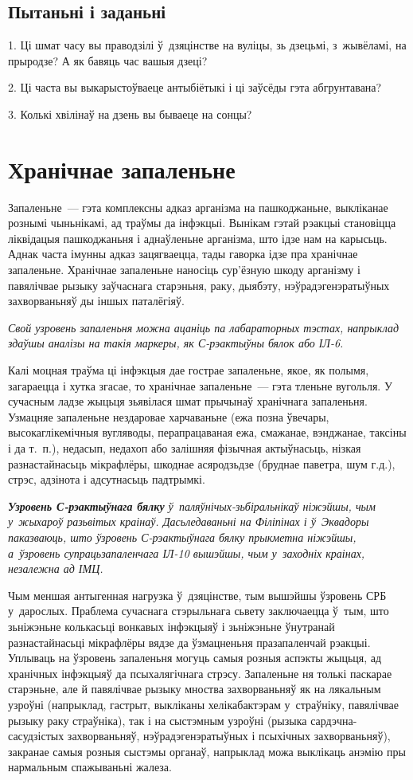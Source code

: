 \subsection*{Пытаньні і заданьні}

1. Ці шмат часу вы праводзілі ў~дзяцінстве на вуліцы, зь дзецьмі, з~жывёламі, на прыродзе? А як бавяць час вашыя дзеці?

2. Ці часта вы выкарыстоўваеце антыбіётыкі і ці заўсёды гэта абгрунтавана?

3. Колькі хвілінаў на дзень вы бываеце на сонцы?


\section{Хранічнае запаленьне}

Запаленьне~--- гэта комплексны адказ арганізма на пашкоджаньне, выкліканае рознымі чыньнікамі, ад траўмы да інфэкцыі. Вынікам гэтай рэакцыі становіцца ліквідацыя пашкоджаньня і аднаўленьне арганізма, што ідзе нам на карысьць. Аднак часта імунны адказ зацягваецца, тады гаворка ідзе пра хранічнае запаленьне. Хранічнае запаленьне наносіць сур'ёзную шкоду арганізму і павялічвае рызыку заўчаснага старэньня, раку, дыябэту, нэўрадэгенэратыўных захворваньняў ды іншых паталёгіяў.

\emph{Свой узровень запаленьня можна ацаніць па лабараторных тэстах, напрыклад здаўшы аналізы на такія маркеры, як С-рэактыўны бялок або ІЛ-6.}

Калі моцная траўма ці інфэкцыя дае гострае запаленьне, якое, як полымя, загараецца і хутка згасае, то хранічнае запаленьне~--- гэта тленьне вугольля. У сучасным ладзе жыцьця зьявілася шмат прычынаў хранічнага запаленьня. Узмацняе запаленьне нездаровае харчаваньне (ежа позна ўвечары, высокаглікемічныя вугляводы, перапрацаваная ежа, смажанае, вэнджанае, таксіны і да т.~п.), недасып, недахоп або залішняя фізычная актыўнасьць, нізкая разнастайнасьць мікрафлёры, шкоднае асяродзьдзе (бруднае паветра, шум г.д.), стрэс, адзінота і адсутнасьць падтрымкі.

\emph{\textbf{Узровень С-рэактыўнага бялку} ў~паляўнічых-зьбіральнікаў ніжэйшы, чым у~жыхароў разьвітых краінаў. Дасьледаваньні на Філіпінах і ў~Эквадоры паказваюць, што ўзровень С-рэактыўнага бялку прыкметна ніжэйшы, а~ўзровень супрацьзапаленчага ІЛ-10 вышэйшы, чым у~заходніх краінах, незалежна ад ІМЦ.}

Чым меншая антыгенная нагрузка ў~дзяцінстве, тым вышэйшы ўзровень СРБ у~дарослых. Праблема сучаснага стэрыльнага сьвету заключаецца ў~тым, што зьніжэньне колькасьці вонкавых інфэкцыяў і зьніжэньне ўнутранай разнастайнасьці мікрафлёры вядзе да ўзмацненьня празапаленчай рэакцыі. Уплываць на ўзровень запаленьня могуць самыя розныя аспэкты жыцьця, ад хранічных інфэкцыяў да псыхалягічнага стрэсу. Запаленьне ня толькі паскарае старэньне, але й павялічвае рызыку мноства захворваньняў як на лякальным узроўні (напрыклад, гастрыт, выкліканы хелікабактэрам у~страўніку, павялічвае рызыку раку страўніка), так і на сыстэмным узроўні (рызыка сардэчна-сасудзістых захворваньняў, нэўрадэгенэратыўных і псыхічных захворваньняў), закранае самыя розныя сыстэмы органаў, напрыклад можа выклікаць анэмію пры нармальным спажываньні жалеза.

